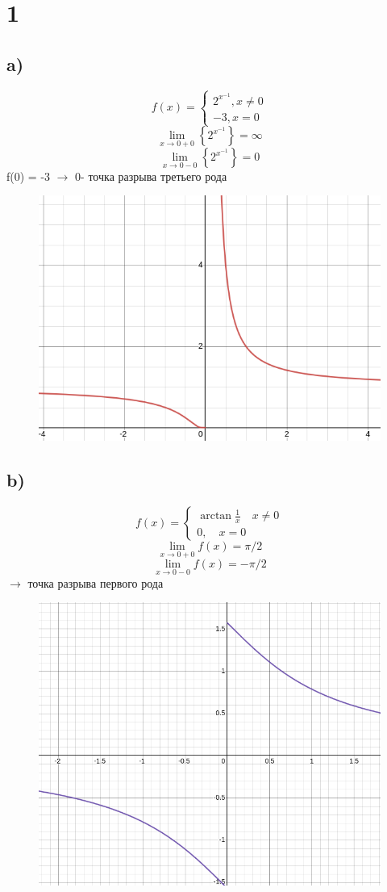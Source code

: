 

	\section*{1}
	\subsection*{a)}
	$$f(x) = \begin{cases}
		2^{x^{-1}},x\ne0\\
	-3,x = 0	\end{cases}$$
	$$\lim_{x\to 0+0}\left\{2^{x^{-1}}\right\} = \infty$$
	$$\lim_{x\to 0-0}\left\{2^{x^{-1}}\right\} = 0$$
	f(0) = -3 $\to $ 0- точка разрыва третьего рода
	\begin{figure}[h]
		\centering
		\includegraphics[width=0.8\linewidth]{Screenshot from 2023-11-24 11-38-33.png}
		\label{fig:mpr}
	\end{figure}
	\subsection*{b)}
	$$f(x)= \begin{cases}
	\arctan{\frac1x}\quad x\ne0 \\
	0,\quad x=0	\end{cases}$$
		$$\lim_{x\to 0+0}f(x) = \pi/2$$
	$$\lim_{x\to 0-0}f(x) = -\pi/2$$ $\to $ точка разрыва первого рода
		\begin{figure}[h]
		\centering
		\includegraphics[width=0.8\linewidth]{Screenshot from 2023-11-24 11-51-25.png}
		\label{fig:mpr}
	\end{figure}
